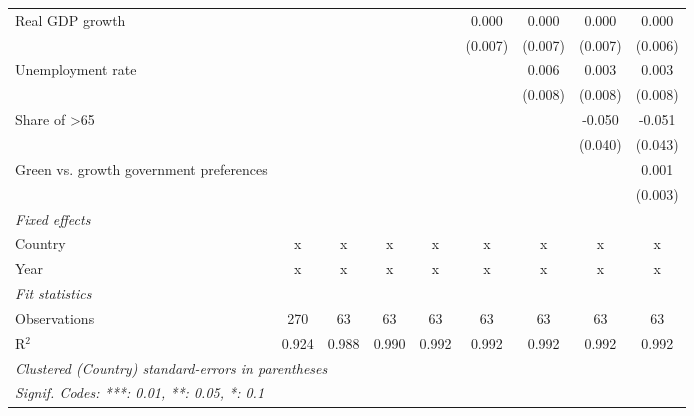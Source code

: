 \begin{table}[htbp]
\begin{tabular}{lcccccccc}
      Real GDP growth                                                       &         &         &               &                & 0.000          & 0.000          & 0.000          & 0.000\\   
                                                                            &         &         &               &                & (0.007)        & (0.007)        & (0.007)        & (0.006)\\   
      Unemployment rate                                                     &         &         &               &                &                & 0.006          & 0.003          & 0.003\\   
                                                                            &         &         &               &                &                & (0.008)        & (0.008)        & (0.008)\\   
      Share of >65                                                          &         &         &               &                &                &                & -0.050         & -0.051\\   
                                                                            &         &         &               &                &                &                & (0.040)        & (0.043)\\   
      Green vs. growth government preferences                               &         &         &               &                &                &                &                & 0.001\\   
                                                                            &         &         &               &                &                &                &                & (0.003)\\   
      \emph{Fixed effects}\\
      Country                                                               & x       & x       & x             & x              & x              & x              & x              & x\\  
      Year                                                                  & x       & x       & x             & x              & x              & x              & x              & x\\  
      \midrule \emph{Fit statistics}\\
      Observations                                                          & 270     & 63      & 63            & 63             & 63             & 63             & 63             & 63\\  
      R$^2$                                                                 & 0.924   & 0.988   & 0.990         & 0.992          & 0.992          & 0.992          & 0.992          & 0.992\\  
      \midrule
      \multicolumn{9}{l}{\emph{Clustered (Country) standard-errors in parentheses}}\\
      \multicolumn{9}{l}{\emph{Signif. Codes: ***: 0.01, **: 0.05, *: 0.1}}\\
   \end{tabular}
\end{table}


